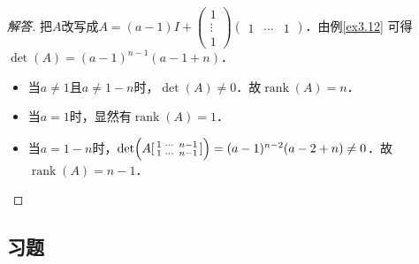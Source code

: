 \documentclass[a4paper,fontset=windows]{ctexbook}
\theoremstyle{definition}
\DeclareMathOperator{\rank}{rank}
\begin{document}
\begin{proof}[解答]
把$A$改写成$A=(a-1)I+\begin{pmatrix}1 \\ \vdots \\ 1\end{pmatrix}\begin{pmatrix}1&\cdots&1\end{pmatrix}$．由例\ref{ex3.12} 可得$\det(A)=(a-1)^{n-1}(a-1+n)$．
\begin{itemize}
\item 当$a\ne 1$且$a\ne 1-n$时，$\det(A)\ne 0$．故$\rank(A)=n$．
\item 当$a=1$时，显然有$\rank(A)=1$．
\item 当$a=1-n$时，$\det\Bigl(A[\begin{smallmatrix}1&\cdots&n-1 \\ 1&\cdots&n-1\end{smallmatrix}]\Bigr)=(a-1)^{n-2}(a-2+n)\ne 0$．故$\rank(A)=n-1$．\qedhere
\end{itemize}
\end{proof}

\subsection*{习题}
\end{document}
